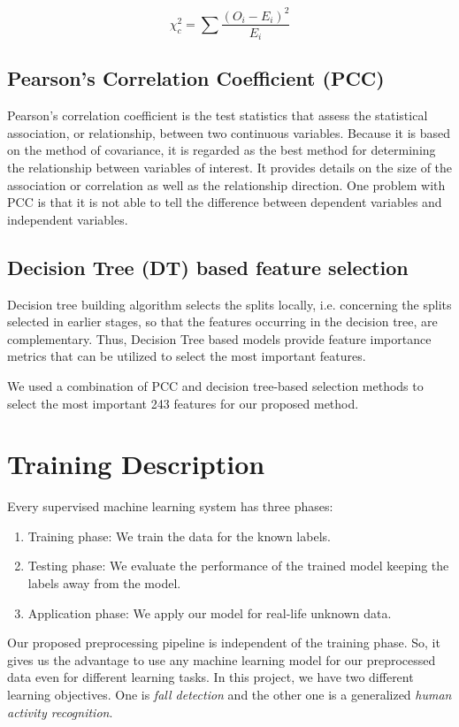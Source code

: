 \begin{equation}
    \chi_c^2 = \sum \frac{(O_i - E_i)^2}{E_i}
\end{equation}

\subsection{Pearson's Correlation Coefficient (PCC) \cite{pcc2020}}
Pearson’s correlation coefficient is the test statistics that assess the statistical association, or relationship, between two continuous variables. Because it is based on the method of covariance, it is regarded as the best method for determining the relationship between variables of interest. It provides details on the size of the association or correlation as well as the relationship direction. One problem with PCC is that it is not able to tell the difference between dependent variables and independent variables.

\subsection{Decision Tree (DT) based feature selection \cite{dtfeatureselection}}
Decision tree building algorithm selects the splits locally, i.e. concerning the splits selected in earlier stages, so that the features occurring in the decision tree, are complementary. Thus, Decision Tree based models provide feature importance metrics that can be utilized to select the most important features. 

We used a combination of PCC and decision tree-based selection methods to select the most important 243 features for our proposed method.


\section{Training Description}
Every supervised machine learning system has three phases: 
\begin{enumerate}
    \item Training phase: We train the data for the known labels.
    \item Testing phase: We evaluate the performance of the trained model keeping the labels away from the model.
    \item Application phase: We apply our model for real-life unknown data.
\end{enumerate}

Our proposed preprocessing pipeline is independent of the training phase. So, it gives us the advantage to use any machine learning model for our preprocessed data even for different learning tasks. In this project, we have two different learning objectives. One is \emph{fall detection} and the other one is a generalized \emph{human activity recognition}. 
